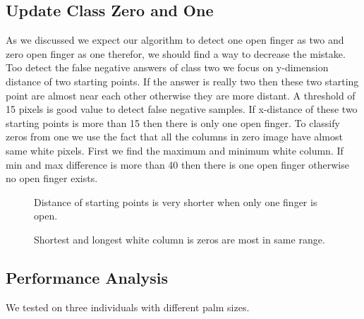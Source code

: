 \documentclass{report}
\begin{document}
\subsection{Update Class Zero and One}
As we discussed we expect our algorithm to detect one open finger as two and zero open finger as one therefor, we should find a way to decrease the mistake. Too detect the false negative answers of class two we focus on y-dimension distance of two starting points. If the answer is really two then these two starting point are almost near each other otherwise they are more distant. A threshold of 15 pixels is good value to detect false negative samples. If x-distance of these two starting points is more than 15 then there is only one open finger. \newline
To classify zeros from one we use the fact that all the columns in zero image have almost same white pixels. First we find the maximum and minimum white column. If min and max difference is more than 40 then there is one open finger otherwise no open finger exists.
\begin{figure}
\caption{Distance of starting points is very shorter when only one finger is open.}
\end{figure}
\begin{figure}
\caption{Shortest and longest white column is zeros are most in same range.}
\end{figure}


\subsection{Performance Analysis}
We tested on three individuals with different palm sizes. \newline
{}
\end{document}
